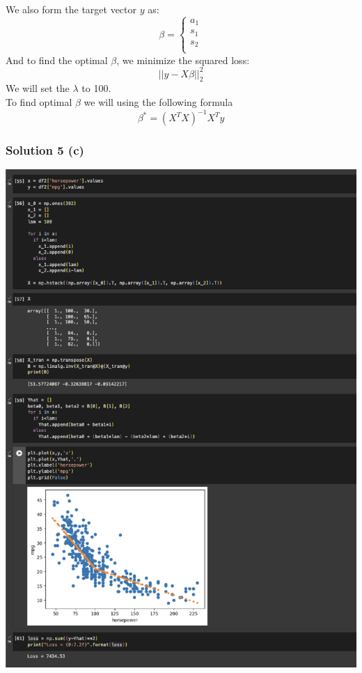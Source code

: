 \documentclass{assignment}
\begin{document}
We also form the target vector $y$ as:
\begin{equation}
    \beta =  \begin{cases}
        a_1\\
        s_1\\
        s_2\\
    \end{cases} 
\end{equation}
And to find the optimal $\beta$, we minimize the squared loss:
\begin{equation}
    ||y-X\beta||^2_2
\end{equation}
We will set the $\lambda$ to 100. \\
To find optimal $\beta$ we will using the following formula
\begin{equation}
    \beta^* = (X^TX)^{-1}X^Ty
\end{equation}
\subsubsection*{Solution 5 (c)}
\includegraphics[trim={0 1.9cm 0 0},clip]{Screenshot 2024-02-15 at 19.28.37.png} \\
\end{document}
